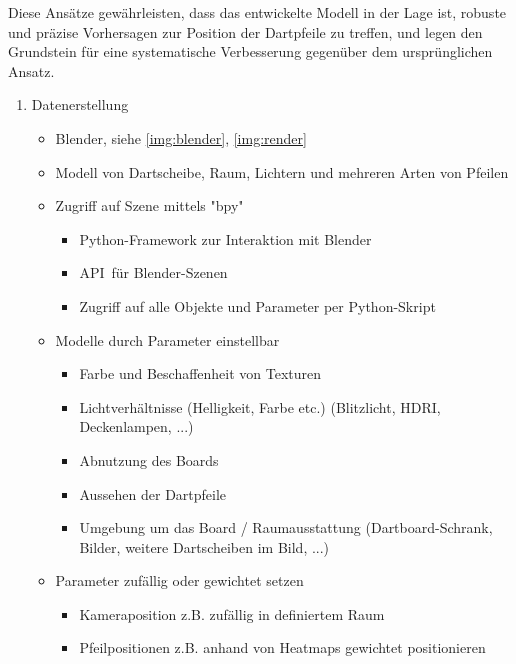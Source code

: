 Diese Ansätze gewährleisten, dass das entwickelte Modell in der Lage ist, robuste und präzise Vorhersagen zur Position der Dartpfeile zu treffen, und legen den Grundstein für eine systematische Verbesserung gegenüber dem ursprünglichen Ansatz.

\iffalse
\begin{enumerate}
    \item Datenerstellung
    \begin{itemize}
        \item Blender, siehe \autoref{img:blender}, \autoref{img:render}
        \item Modell von Dartscheibe, Raum, Lichtern und mehreren Arten von Pfeilen

        \item Zugriff auf Szene mittels "bpy"
        \begin{itemize}
            \item Python-Framework zur Interaktion mit Blender
            \item \glqq API\grqq\, für Blender-Szenen
            \item Zugriff auf alle Objekte und Parameter per Python-Skript
        \end{itemize}

        \item Modelle durch Parameter einstellbar
        \begin{itemize}
            \raggedright
            \item Farbe und Beschaffenheit von Texturen
            \item Lichtverhältnisse (Helligkeit, Farbe etc.) (Blitzlicht, HDRI, Deckenlampen, ...)
            \item Abnutzung des Boards
            \item Aussehen der Dartpfeile
            \item Umgebung um das Board / Raumausstattung (Dartboard-Schrank, Bilder, weitere Dartscheiben im Bild, ...)
        \end{itemize}

        \item Parameter zufällig oder gewichtet setzen
        \begin{itemize}
            \item Kameraposition z.B. zufällig in definiertem Raum
            \item Pfeilpositionen z.B. anhand von Heatmaps gewichtet positionieren
        \end{itemize}


\end{itemize}
\end{enumerate}
